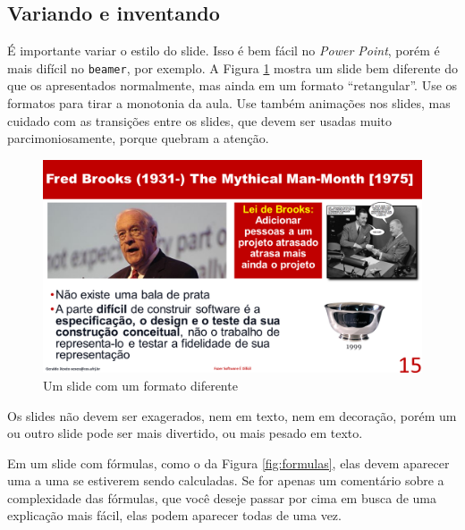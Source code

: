 \subsection{Variando e inventando}


É importante variar o estilo do slide. Isso é bem fácil no \textit{Power Point}, porém é mais difícil no \texttt{beamer}, por exemplo. A Figura \ref{fig:man} mostra um slide bem diferente do que os apresentados normalmente, mas ainda em um formato ``retangular''. Use os formatos para tirar a monotonia da aula. Use também animações nos slides, mas cuidado com as transições entre os slides, que devem ser usadas muito parcimoniosamente, porque quebram a atenção.

\begin{figure}[htb]
    \centering
    \includegraphics[width=\tam\linewidth]{imagens/manmonth.png}
    \caption{Um slide com um formato diferente}
    \label{fig:man}
\end{figure}

Os slides não devem ser exagerados, nem em texto, nem em decoração, porém um ou outro slide pode ser mais divertido, ou mais pesado em texto.


Em um slide com fórmulas, como o da Figura \ref{fig:formulas}, elas devem aparecer uma a uma se estiverem sendo calculadas. Se for apenas um comentário sobre a complexidade das fórmulas, que você deseje passar por cima em busca de uma explicação mais fácil, elas podem aparecer todas de uma vez.

